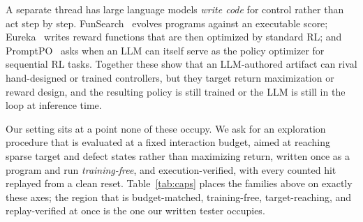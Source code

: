 A separate thread has large language models \emph{write code} for control rather than act step by step.
FunSearch~\citep{funsearch} evolves programs against an executable score; Eureka~\citep{eureka} writes reward functions
that are then optimized by standard RL; and PromptPO~\citep{promptpo} asks when an LLM can itself serve as the policy
optimizer for sequential RL tasks. Together these show that an LLM-authored artifact can rival hand-designed or trained
controllers, but they target return maximization or reward design, and the resulting policy is still trained or the LLM
is still in the loop at inference time.

Our setting sits at a point none of these occupy. We ask for an exploration procedure that is evaluated at a fixed
interaction budget, aimed at reaching sparse target and defect states rather than maximizing return, written once as a
program and run \emph{training-free}, and execution-verified, with every counted hit replayed from a clean reset.
Table~\ref{tab:caps} places the families above on exactly these axes; the region that is budget-matched, training-free,
target-reaching, and replay-verified at once is the one our written tester occupies.

\begin{table}[t]\centering\small
\caption{Where each family sits. Our tester is the one that is budget-matched, training-free, and target-reaching at
once; universality across all tasks is \emph{not} claimed (Section~\ref{sec:result}).}
\label{tab:caps}
\setlength{\tabcolsep}{4pt}
\end{table}
